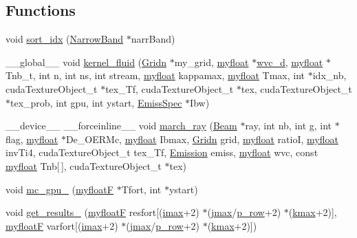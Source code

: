 \subsection*{Functions}
\begin{DoxyCompactItemize}
\item 
void \hyperlink{mc__gpu_8cu_ad7499b86f24bd31ddd5cac176d8e88cb}{sort\+\_\+idx} (\hyperlink{classNarrowBand}{Narrow\+Band} $\ast$narr\+Band)
\item 
\+\_\+\+\_\+global\+\_\+\+\_\+ void \hyperlink{mc__gpu_8cu_ad603ee98b5cd9e3d05deee64b1eceaa6}{kernel\+\_\+fluid} (\hyperlink{classGridn}{Gridn} $\ast$my\+\_\+grid, \hyperlink{param_8h_a5f097c9f3873af7be7fc156e6a06ca5e}{myfloat} $\ast$\hyperlink{mc__gpu_8cu_a64cbc4394e0b9bd53897ba9c9fb88fc4}{wvc\+\_\+d}, \hyperlink{param_8h_a5f097c9f3873af7be7fc156e6a06ca5e}{myfloat} $\ast$Tnb\+\_\+t, int n, int ns, int stream, \hyperlink{param_8h_a5f097c9f3873af7be7fc156e6a06ca5e}{myfloat} kappamax, \hyperlink{param_8h_a5f097c9f3873af7be7fc156e6a06ca5e}{myfloat} Tmax, int $\ast$idx\+\_\+nb, cuda\+Texture\+Object\+\_\+t $\ast$tex\+\_\+\+Tf, cuda\+Texture\+Object\+\_\+t $\ast$tex, cuda\+Texture\+Object\+\_\+t $\ast$tex\+\_\+prob, int gpu, int ystart, \hyperlink{structEmissSpec}{Emiss\+Spec} $\ast$Ibw)
\item 
\+\_\+\+\_\+device\+\_\+\+\_\+ \+\_\+\+\_\+forceinline\+\_\+\+\_\+ void \hyperlink{mc__gpu_8cu_ad6f7a3a9c61ed187d9008e1abe89f357}{march\+\_\+ray} (\hyperlink{definitions_8h_a784616beaf04e11707aff8fd62ce0b8b}{Beam} $\ast$ray, int nb, int g, int $\ast$flag, \hyperlink{param_8h_a5f097c9f3873af7be7fc156e6a06ca5e}{myfloat} $\ast$De\+\_\+\+O\+E\+R\+Mc, \hyperlink{param_8h_a5f097c9f3873af7be7fc156e6a06ca5e}{myfloat} Ibmax, \hyperlink{classGridn}{Gridn} grid, \hyperlink{param_8h_a5f097c9f3873af7be7fc156e6a06ca5e}{myfloat} ratioI, \hyperlink{param_8h_a5f097c9f3873af7be7fc156e6a06ca5e}{myfloat} inv\+Ti4, cuda\+Texture\+Object\+\_\+t tex\+\_\+\+Tf, \hyperlink{structEmission}{Emission} emiss, \hyperlink{param_8h_a5f097c9f3873af7be7fc156e6a06ca5e}{myfloat} wvc, const \hyperlink{param_8h_a5f097c9f3873af7be7fc156e6a06ca5e}{myfloat} Tnb\mbox{[}$\,$\mbox{]}, cuda\+Texture\+Object\+\_\+t $\ast$tex)
\item 
void \hyperlink{mc__gpu_8cu_a9c6c0f0d0dca80f4ac148e59eed79838}{mc\+\_\+gpu\+\_\+} (\hyperlink{param_8h_a8864e4d26f8f44fed5d0ae3d4f9e3c4a}{myfloatF} $\ast$Tfort, int $\ast$ystart)
\item 
void \hyperlink{mc__gpu_8cu_afd9f6194553240239ec004db3c16acec}{get\+\_\+results\+\_\+} (\hyperlink{param_8h_a8864e4d26f8f44fed5d0ae3d4f9e3c4a}{myfloatF} resfort\mbox{[}(\hyperlink{param_8h_a788916a7426baf172c67386359720d6d}{imax}+2) $\ast$(\hyperlink{param_8h_ac5c80d846ec0c4cf1c91fc5d9d66faa1}{jmax}/\hyperlink{param_8h_a149afb59990224def797b29467985bac}{p\+\_\+row}+2) $\ast$(\hyperlink{param_8h_ae0453dd20a7c6a923904df942ef82468}{kmax}+2)\mbox{]}, \hyperlink{param_8h_a8864e4d26f8f44fed5d0ae3d4f9e3c4a}{myfloatF} varfort\mbox{[}(\hyperlink{param_8h_a788916a7426baf172c67386359720d6d}{imax}+2) $\ast$(\hyperlink{param_8h_ac5c80d846ec0c4cf1c91fc5d9d66faa1}{jmax}/\hyperlink{param_8h_a149afb59990224def797b29467985bac}{p\+\_\+row}+2) $\ast$(\hyperlink{param_8h_ae0453dd20a7c6a923904df942ef82468}{kmax}+2)\mbox{]})

\end{DoxyCompactItemize}

